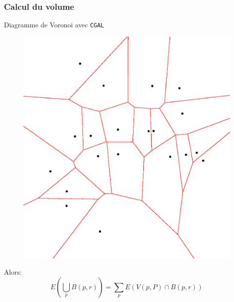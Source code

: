 \documentclass{beamer}
\begin{document}
\begin{frame}
    \frametitle{Calcul du volume}

    Diagramme de Voronoi avec \texttt{CGAL}
    \begin{figure}
        \centering
        \includegraphics[scale=0.28]{img/voronoi-diagram-2d}
    \end{figure}

    Alors:
    $$ E \left( \bigcup_p B(p, r) \right) = \sum_p E(V(p, P) \cap B(p, r)) $$
\end{frame}


\end{document}
